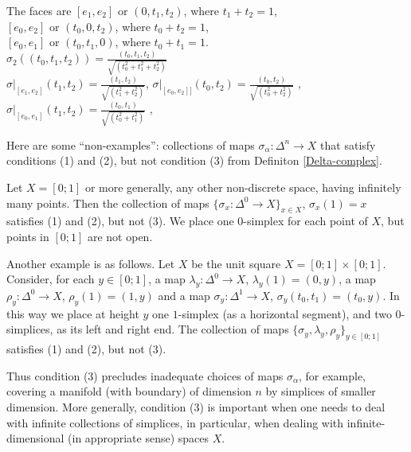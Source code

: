 \documentclass[11pt,a4paper]{report}
\begin{document}
\begin{Ex}
            The faces are $[e_1, e_2]$ or $(0, t_1, t_2)$, where $t_1 + t_2 = 1$, \\	
            $[e_0, e_2]$ or $(t_0, 0, t_2)$, where $t_0 + t_2 = 1$, \\	
            $[e_0, e_1]$ or $(t_0, t_1, 0)$, where $t_0 + t_1 = 1$. \\	
              	
              $\sigma_2((t_0, t_1, t_2)) = \frac{(t_0, t_1, t_2)}{\sqrt{(t_0^2 + t_1^2 + t_2^2)}}$ \\ 	
              $\sigma|_{[e_1, e_2]}(t_1, t_2) =\frac{(t_1, t_2)}{\sqrt{(t_1^2 + t_2^2)}}$, \quad	
              $\sigma|_{[e_0, e_2]]}(t_0, t_2) =\frac{(t_0, t_2)}{\sqrt{(t_0^2 + t_2^2)}}$ , \quad	
              $\sigma|_{[e_0, e_1]}(t_1, t_2) =\frac{(t_0, t_1)}{\sqrt{(t_0^2 + t_1^2)}}$ ,	
     \end{Ex}	
     	
	  Here are some ``non-examples'': collections of maps $\sigma_\alpha:\Delta^n\to X$ that satisfy conditions (1) and (2), but not condition (3) from Definiton \ref{Delta-complex}.	
     \begin{Ex}	
     	Let $X=[0;1]$ or more generally, any other non-discrete space, having infinitely many points. Then the collection	
     	of  maps $\{\sigma_x:\Delta^0\to X\}_{x\in X}$, $\sigma_x(1)=x$ 	
     	satisfies (1) and (2), but not (3). We place  one $0$-simplex for each point of $X$, but  points in $[0;1]$ are not open.	
     		
     	Another  example is as follows. Let $X$ be the unit square $X=[0;1]\times [0;1]$. Consider, for each $y\in [0;1]$, a  map	
     	$\lambda_y:\Delta^0\to X$, $\lambda_y(1)=(0,y)$, a map $\rho_y:\Delta^0\to X$, $\rho_y(1)=(1,y)$ and a map	
     	$\sigma_y:\Delta^1\to X$, $\sigma_y(t_0,t_1)= (t_0,y)$. In this way we place  at height $y$ one $1$-simplex (as a horizontal segment), 	
     	and two $0$-simplices, as its left and right end. The collection of maps $\{\sigma_y, \lambda_y, \rho_y\}_{y\in[0;1]}$ satisfies (1) and (2), 	
     	but not (3).	
     \end{Ex}	
	  Thus condition (3) precludes inadequate choices of maps $\sigma_\alpha$, for example, covering a manifold (with boundary) of dimension $n$ by simplices	
	  of smaller dimension.	
	  More generally, condition (3) is important when one needs to deal with  infinite collections of simplices, in particular, when dealing with	
	  infinite-dimensional (in appropriate sense) spaces $X$.	
\end{document}
